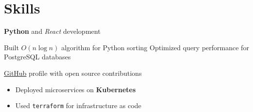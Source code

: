 \documentclass{article}
\begin{document}
\section{Skills}
\textbf{Python} and \textit{React} development

Built $O(n \log n)$ algorithm for Python sorting
Optimized query performance for PostgreSQL databases

\href{https://github.com}{GitHub} profile with open source contributions

  

\begin{itemize}
\item Deployed microservices on \textbf{Kubernetes}
\item Used \texttt{terraform} for infrastructure as code
\end{itemize}
\end{document}
